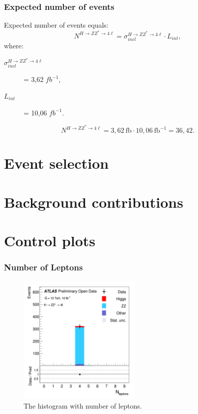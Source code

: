\documentclass[aspectratio=1610, english]{beamer}
\newcommand{\hzz}{ H\rightarrow ZZ^{*}\rightarrow 4 \ell}
\begin{document}
\begin{frame}
\frametitle{Expected number of events}
Expected number of events equals:
\begin{equation}
N^{ \hzz }=\sigma^{ \hzz }_{incl} \cdot L_{int},
\end{equation}
where:
\begin{description}
\item[$\sigma^{ \hzz }_{incl}$] = 3,62 $fb^{-1}$,
\item[$L_{int}$] = 10,06 $fb^{-1}$.
\end{description}
\vspace{1cm}
\begin{equation}
N^{ \hzz }=3,62 \: \mathrm{fb} \cdot 10,06 \: \mathrm{fb}^{-1} = 36,42.
\end{equation}

\end{frame}
\section{Event selection}

\section{Background contributions}

\section{Control plots}

\begin{frame}
\frametitle{Number of Leptons}

\begin{figure} [H]
\centering
\includegraphics[width=6cm]{hist_n_lept.png}
\caption{The histogram with number of leptons. }
\end{figure}

\end{frame}
\end{document}
